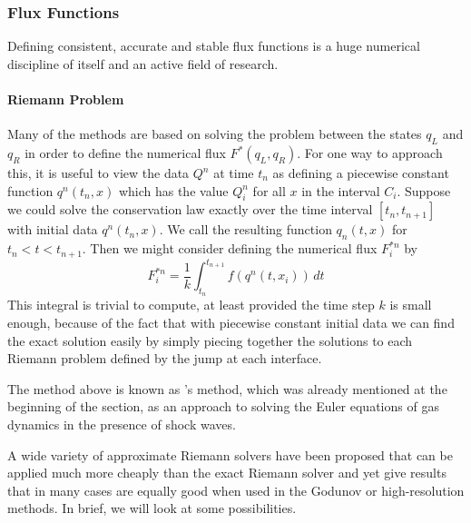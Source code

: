 \subsubsection{Flux Functions}
\label{sec:flux-functions}
Defining consistent, accurate and stable flux functions is a huge numerical
discipline of itself and an active field of research.

\paragraph{Riemann Problem}
Many of the methods are based on solving the  problem between the
states $q_L$ and $q_R$ in order to define the numerical flux $F^*(q_L,q_R)$.
For one way to approach this, it is useful to view the data $Q^n$ at time $t_n$
as defining a piecewise constant function $q^n(t_n,x)$ which has the value
$Q^n_i$ for all $x$ in the interval $C_i$. Suppose we could solve the
conservation law exactly over the time interval $[t_n, t_{n+1}]$ with initial
data  $q^n(t_n,x)$. We call the resulting function $q_n(t,x)$ for $t_n < t <
t_{n+1}$. Then we might consider defining the numerical flux $F^{*n}_i$ by
\begin{equation}
    F^{*n}_i = \frac{1}{k} \int_{t_n}^{t_{n+1}} f(q^n(t,x_i))\,dt
\end{equation}
This integral is trivial to compute, at least provided the time step $k$ is
small enough, because of the fact that with piecewise constant initial data we
can find the exact solution easily by simply piecing together the solutions to
each Riemann problem defined by the jump at each interface.

The method above is known as 's method, which was already mentioned
at the beginning of the section, as an approach to solving the Euler equations
of gas dynamics in the presence of shock waves.

A wide variety of approximate Riemann solvers have been proposed
that can be applied much more cheaply than the exact Riemann solver and yet
give results that in many cases are equally good when used in the Godunov or
high-resolution methods. In brief, we will look at some possibilities.

